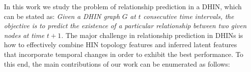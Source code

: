 In this work we study the problem of relationship prediction in a DHIN, which can be stated as: \textit{Given a DHIN graph $G$ at $t$ consecutive time intervals, the objective is to predict the existence of a particular relationship between two given nodes at time $t+1$.} The major challenge in relationship prediction in DHINs is how to effectively combine HIN topology features and inferred latent features that incorporate temporal changes in order to exhibit the best performance. %
To this end, the main contributions of our work can be enumerated as follows:













